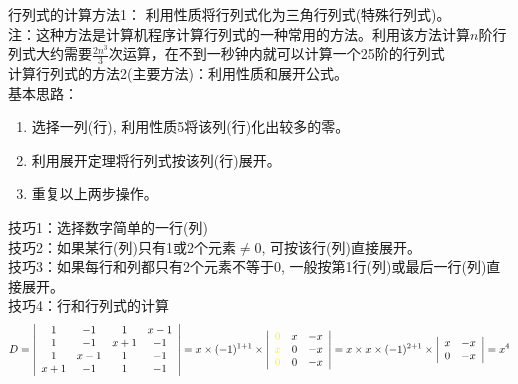 {\color{blue}行列式的计算方法1：} 利用性质将行列式化为三角行列式(特殊行列式)。\\
{\color{red}注：}这种方法是计算机程序计算行列式的一种常用的方法。利用该方法计算$n$阶行列式大约需要$\frac{2n^{3}}{3}$次运算，在不到一秒钟内就可以计算一个25阶的行列式\\
{\color{blue}计算行列式的方法2(主要方法)：}利用性质和展开公式。 \\
{\color{blue}基本思路：}
\begin{enumerate}
    \item{选择一列(行), 利用性质5将该列(行)化出较多的零。}
    \item{利用展开定理将行列式按该列(行)展开。}
    \item{重复以上两步操作。}
\end{enumerate}
{\color{blue}技巧1：}选择数字简单的一行(列)\\
{\color{blue}技巧2：}如果某行(列)只有1或2个元素$\neq 0$, 可按该行(列)直接展开。\\
{\color{blue}技巧3：}如果每行和列都只有2个元素不等于0, 一般按第1行(列)或最后一行(列)直接展开。\\
{\color{blue}技巧4：}行和行列式的计算
$$
D=\left|
\begin{array}{cccc}
    1   & -1  & 1   & x-1 \\
    1   & -1  & x+1 & -1  \\    
    1   & x-1 & 1   & -1  \\    
    x+1 & -1  & 1   & -1  \\
\end{array}\right|
=x\times (-1)^{1+1} \times \left|
\begin{array}{ccc}
    {\color{yellow} 0} & x & -x \\
    {\color{yellow} x} & 0 & -x \\    
    {\color{yellow} 0} & 0 & -x \\
\end{array}\right|=x\times x \times (-1)^{2+1}\times\left|
\begin{array}{cc}
    x & -x \\
    0 & -x \\    
\end{array}\right|=x^{4}
$$




